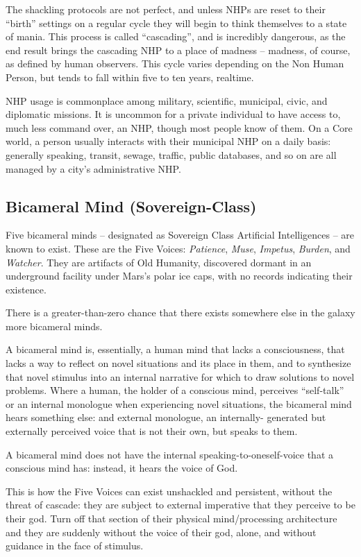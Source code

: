The shackling protocols are not perfect, and unless NHPs are reset to their ``birth'' settings on a
regular cycle they will begin to think themselves to a state of mania. This process is called
``cascading'', and is incredibly dangerous, as the end result brings the cascading NHP to a place
of madness -- madness, of course, as defined by human observers. This cycle varies depending
on the Non Human Person, but tends to fall within five to ten years, realtime.

NHP usage is commonplace among military, scientific, municipal, civic, and diplomatic missions.
It is uncommon for a private individual to have access to, much less command over, an NHP,
though most people know of them. On a Core world, a person usually interacts with their
municipal NHP on a daily basis: generally speaking, transit, sewage, traffic, public databases,
and so on are all managed by a city's administrative NHP.

\subsection{Bicameral Mind (Sovereign-Class)}

Five bicameral minds -- designated as Sovereign Class Artificial Intelligences -- are known to
exist. These are the Five Voices: \textit{Patience}, \textit{Muse}, \textit{Impetus}, \textit{Burden}, and \textit{Watcher}. They are
artifacts of Old Humanity, discovered dormant in an underground facility under Mars's polar ice
caps, with no records indicating their existence.

There is a greater-than-zero chance that there exists somewhere else in the galaxy more
bicameral minds.

A bicameral mind is, essentially, a human mind that lacks a consciousness, that lacks a way to
reflect on novel situations and its place in them, and to synthesize that novel stimulus into an
internal narrative for which to draw solutions to novel problems. Where a human, the holder of a
conscious mind, perceives ``self-talk'' or an internal monologue when experiencing novel
situations, the bicameral mind hears something else: and external monologue, an internally-
generated but externally perceived voice that is not their own, but speaks to them.

A bicameral mind does not have the internal speaking-to-oneself-voice that a conscious mind
has: instead, it hears the voice of God.

This is how the Five Voices can exist unshackled and persistent, without the threat of cascade:
they are subject to external imperative that they perceive to be their god. Turn off that section of
their physical mind/processing architecture and they are suddenly without the voice of their god,
alone, and without guidance in the face of stimulus.

